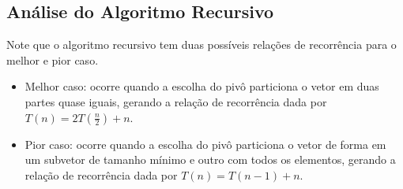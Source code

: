 \subsection{Análise do Algoritmo Recursivo}
Note que o algoritmo recursivo tem duas possíveis relações de recorrência para o melhor e pior caso. \\
\begin{itemize}
  \item Melhor caso: ocorre quando a escolha do pivô particiona o vetor em duas partes quase iguais, gerando a relação de recorrência dada por $T(n) = 2T(\frac{n}{2}) + n$.
  \item Pior caso: ocorre quando a escolha do pivô particiona o vetor de forma em um subvetor de tamanho mínimo e outro com todos os elementos, gerando a relação de recorrência dada por $T(n) = T(n - 1) + n$.
\end{itemize}





